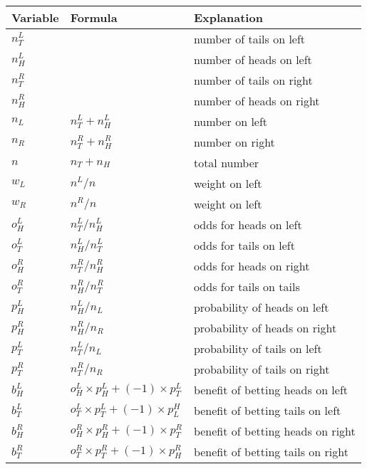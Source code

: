 \begin{table}
\centering
\begin{tabular}{|l|l|l|} \\ \hline \hline
{\bf Variable} & {\bf Formula} & {\bf Explanation} \\ \hline \hline
\(n_T^L\)  & & number of tails on left \\ \hline
\(n_H^L\)  & & number of heads on left \\ \hline
\(n_T^R\)  & & number of tails on right \\ \hline
\(n_H^R\) & & number of heads on right \\ \hline

\(n_L\)    & \(n_T^L + n_H^L \) & number on left \\ \hline
\(n_R\)    & \(n_T^R + n_H^R \) & number on right \\ \hline

\(n\)      & \(n_T + n_H \) & total number \\ \hline

\(w_L \) & \( n^L/n\)  & weight on left \\ \hline
\(w_R \) & \( n^R/n\)  & weight on left \\ \hline
\hline
\(o_H^L \) & \( n_T^L/n_H^L\) & odds for heads on left \\ \hline
\(o_T^L \) & \( n_H^L/n_T^L\) & odds for tails on left \\ \hline
\(o_H^R \) & \( n_T^R/n_H^R\) & odds for heads on right \\ \hline
\(o_T^R \) & \( n_H^R/n_T^R\) & odds for tails on tails \\ \hline
\hline

\(p_H^L \) & \( n_H^L/n_L\) & probability of heads on left \\ \hline
\(p_H^R \) & \( n_H^R/n_R\) & probability of heads on right \\ \hline
\(p_T^L \) & \( n_T^L/n_L\) & probability of tails on left \\ \hline
\(p_T^R \) & \( n_T^R/n_R\) & probability of tails on right \\ \hline
\hline

\(b_H^L\) &  \(o_H^L \times p_H^L + (-1)  \times p_T^L\) &
            benefit of betting heads on left \\ \hline
\(b_T^L\) & \(o_T^L \times p_T^L + (-1)  \times p^H_L \) &
            benefit of betting tails on left \\ \hline

\(b_H^R\) & \(o_H^R \times p_H^R + (-1)  \times p_T^R \) &
            benefit of betting heads on right \\ \hline
\(b_T^R\) & \(o_T^R \times p_T^R + (-1)  \times p_H^R \) &
            benefit of betting tails on right \\ \hline
\hline


\end{tabular}
\end{table}
